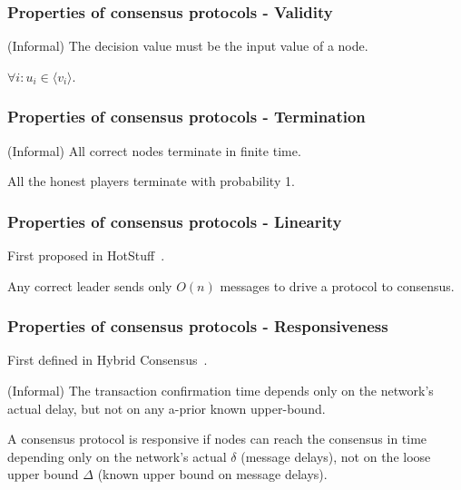 \documentclass{beamer}
\begin{document}
\begin{frame}
\frametitle{Properties of consensus protocols - Validity}

(Informal) The decision value must be the input value of a node.

\begin{definition}[Validity]
$\forall i: u_i \in \langle v_i \rangle$.
\end{definition}

\end{frame}


\begin{frame}
\frametitle{Properties of consensus protocols - Termination}

(Informal) All correct nodes terminate in finite time.

\begin{definition}[Termination]
All the honest players terminate with probability 1.
\end{definition}

\end{frame}



\begin{frame}
\frametitle{Properties of consensus protocols - Linearity}

First proposed in HotStuff~\cite{yin2019hotstuff}.

\begin{definition}[Linearity]
Any correct leader sends only $O(n)$ messages to drive a protocol to consensus.
\end{definition}



\end{frame}



\begin{frame}
\frametitle{Properties of consensus protocols - Responsiveness}

First defined in Hybrid Consensus~\cite{pass2017hybrid}.

(Informal) The transaction confirmation time depends only on the network’s actual delay, but not on any a-prior known upper-bound.

\begin{definition}[Responsiveness]
A consensus protocol is responsive if nodes can reach the consensus in time depending only on the network’s actual $\delta$ (message delays), not on the loose upper bound $\Delta$ (known upper bound on message delays).
\end{definition}

\end{frame}
\end{document}
